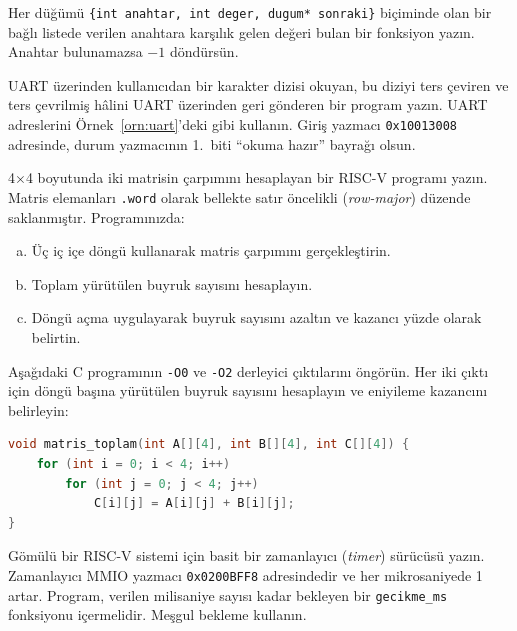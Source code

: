\begin{alistirma}[\orta]
Her düğümü \texttt{\{int anahtar, int deger, dugum* sonraki\}} biçiminde olan bir bağlı listede verilen anahtara karşılık gelen değeri bulan bir fonksiyon yazın. Anahtar bulunamazsa $-1$ döndürsün.
\end{alistirma}

\begin{alistirma}[\orta]
UART üzerinden kullanıcıdan bir karakter dizisi okuyan, bu diziyi ters çeviren ve ters çevrilmiş hâlini UART üzerinden geri gönderen bir program yazın. UART adreslerini Örnek~\ref{orn:uart}'deki gibi kullanın. Giriş yazmacı \texttt{0x10013008} adresinde, durum yazmacının 1.\ biti ``okuma hazır'' bayrağı olsun.
\end{alistirma}

\begin{alistirma}[\zor]
4$\times$4 boyutunda iki matrisin çarpımını hesaplayan bir RISC-V programı yazın. Matris elemanları \texttt{.word} olarak bellekte satır öncelikli (\emph{row-major}) düzende saklanmıştır. Programınızda:
\begin{enumerate}[(a)]
\item Üç iç içe döngü kullanarak matris çarpımını gerçekleştirin.
\item Toplam yürütülen buyruk sayısını hesaplayın.
\item Döngü açma uygulayarak buyruk sayısını azaltın ve kazancı yüzde olarak belirtin.
\end{enumerate}
\end{alistirma}

\begin{alistirma}[\zor]
Aşağıdaki C programının \texttt{-O0} ve \texttt{-O2} derleyici çıktılarını öngörün. Her iki çıktı için döngü başına yürütülen buyruk sayısını hesaplayın ve eniyileme kazancını belirleyin:
\begin{lstlisting}[language=C, style=alistirma-kod]
void matris_toplam(int A[][4], int B[][4], int C[][4]) {
    for (int i = 0; i < 4; i++)
        for (int j = 0; j < 4; j++)
            C[i][j] = A[i][j] + B[i][j];
}
\end{lstlisting}
\end{alistirma}

\begin{alistirma}[\zor]
Gömülü bir RISC-V sistemi için basit bir zamanlayıcı (\emph{timer}) sürücüsü yazın. Zamanlayıcı MMIO yazmacı \texttt{0x0200BFF8} adresindedir ve her mikrosaniyede 1 artar. Program, verilen milisaniye sayısı kadar bekleyen bir \texttt{gecikme\_ms} fonksiyonu içermelidir. Meşgul bekleme kullanın.
\end{alistirma}

